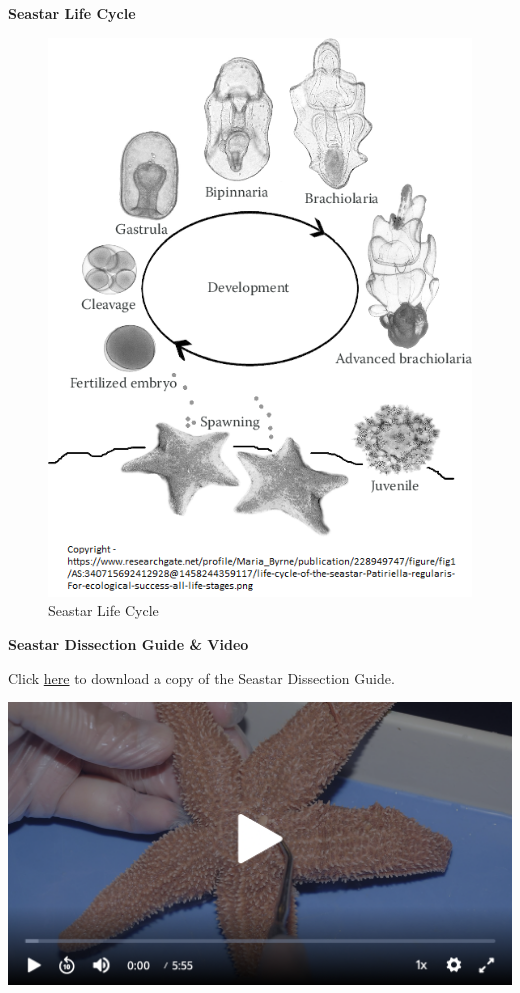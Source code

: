 \documentclass[
]{book}
\begin{document}
\textbf{Seastar Life Cycle}

\begin{figure}
\centering
\includegraphics{images/Lab6_seastar_life_cycle.png}
\caption{Seastar Life Cycle}
\end{figure}

\textbf{Seastar Dissection Guide \& Video}

Click \href{https://osf.io/download/y89wz}{here} to download a copy of the Seastar Dissection Guide.

\includegraphics{images/Lab6_Seastar_Dissection_Video1.png}
\end{document}
